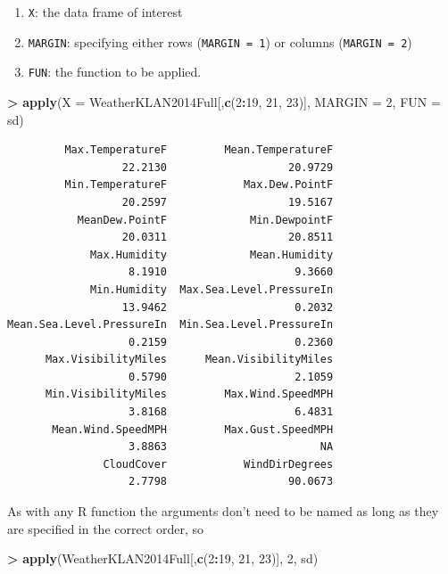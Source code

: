 \documentclass[
]{krantz}
\makeatletter
\newenvironment{Shaded}{\begin{snugshade}}{\end{snugshade}}
\newcommand{\DataTypeTok}[1]{\textcolor[rgb]{0.27,0.27,0.27}{#1}}
\newcommand{\DecValTok}[1]{\textcolor[rgb]{0.06,0.06,0.06}{#1}}
\newcommand{\KeywordTok}[1]{\textcolor[rgb]{0.27,0.27,0.27}{\textbf{#1}}}
\newcommand{\NormalTok}[1]{#1}
\newcommand{\OperatorTok}[1]{\textcolor[rgb]{0.43,0.43,0.43}{\textbf{#1}}}
\newcommand{\StringTok}[1]{\textcolor[rgb]{0.5,0.5,0.5}{#1}}
\providecommand{\tightlist}{%
  \setlength{\itemsep}{0pt}\setlength{\parskip}{0pt}}
\newenvironment{kframe}{%
\medskip{}
\setlength{\fboxsep}{.8em}
 \def\at@end@of@kframe{}%
 \ifinner\ifhmode%
  \def\at@end@of@kframe{\end{minipage}}%
  \begin{minipage}{\columnwidth}%
 \fi\fi%
 \def\FrameCommand##1{\hskip\@totalleftmargin \hskip-\fboxsep
 \colorbox{shadecolor}{##1}\hskip-\fboxsep
     \hskip-\linewidth \hskip-\@totalleftmargin \hskip\columnwidth}%
 \MakeFramed {\advance\hsize-\width
   \@totalleftmargin\z@ \linewidth\hsize
   \@setminipage}}%
 {\par\unskip\endMakeFramed%
 \at@end@of@kframe}
\renewenvironment{Shaded}{\begin{kframe}}{\end{kframe}}
\makeatother
\begin{document}
\begin{enumerate}
\def\labelenumi{\arabic{enumi}.}
\tightlist
\item
  \texttt{X}: the data frame of interest
\item
  \texttt{MARGIN}: specifying either rows (\texttt{MARGIN\ =\ 1}) or columns (\texttt{MARGIN\ =\ 2})
\item
  \texttt{FUN}: the function to be applied.
\end{enumerate}

\begin{Shaded}
\begin{Highlighting}[]
\OperatorTok{\textgreater{}}\StringTok{ }\KeywordTok{apply}\NormalTok{(}\DataTypeTok{X =}\NormalTok{ WeatherKLAN2014Full[,}\KeywordTok{c}\NormalTok{(}\DecValTok{2}\OperatorTok{:}\DecValTok{19}\NormalTok{, }\DecValTok{21}\NormalTok{, }\DecValTok{23}\NormalTok{)], }\DataTypeTok{MARGIN =} \DecValTok{2}\NormalTok{, }\DataTypeTok{FUN =}\NormalTok{ sd)}
\end{Highlighting}
\end{Shaded}

\begin{verbatim}
         Max.TemperatureF         Mean.TemperatureF 
                  22.2130                   20.9729 
         Min.TemperatureF            Max.Dew.PointF 
                  20.2597                   19.5167 
           MeanDew.PointF             Min.DewpointF 
                  20.0311                   20.8511 
             Max.Humidity             Mean.Humidity 
                   8.1910                    9.3660 
             Min.Humidity  Max.Sea.Level.PressureIn 
                  13.9462                    0.2032 
Mean.Sea.Level.PressureIn  Min.Sea.Level.PressureIn 
                   0.2159                    0.2360 
      Max.VisibilityMiles      Mean.VisibilityMiles 
                   0.5790                    2.1059 
      Min.VisibilityMiles         Max.Wind.SpeedMPH 
                   3.8168                    6.4831 
       Mean.Wind.SpeedMPH         Max.Gust.SpeedMPH 
                   3.8863                        NA 
               CloudCover            WindDirDegrees 
                   2.7798                   90.0673 
\end{verbatim}

As with any R function the arguments don't need to be named as long as they are specified in the correct order, so

\begin{Shaded}
\begin{Highlighting}[]
\OperatorTok{\textgreater{}}\StringTok{ }\KeywordTok{apply}\NormalTok{(WeatherKLAN2014Full[,}\KeywordTok{c}\NormalTok{(}\DecValTok{2}\OperatorTok{:}\DecValTok{19}\NormalTok{, }\DecValTok{21}\NormalTok{, }\DecValTok{23}\NormalTok{)], }\DecValTok{2}\NormalTok{, sd)}
\end{Highlighting}
\end{Shaded}
\end{document}
